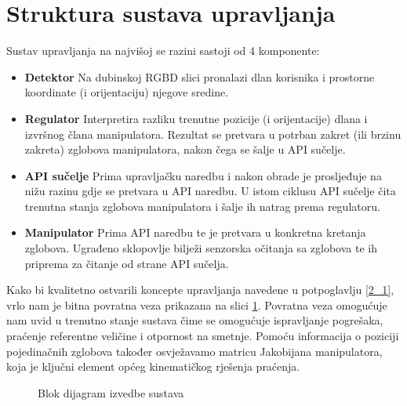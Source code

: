 \documentclass[times, utf8, diplomski, numeric]{fer}
\begin{document}
\section{Struktura sustava upravljanja}
Sustav upravljanja na najvišoj se razini sastoji od 4 komponente:
\begin{itemize}
  \item \textbf{Detektor} Na dubinskoj RGBD slici pronalazi dlan korisnika i prostorne koordinate (i orijentaciju) njegove sredine. 
  \item \textbf{Regulator} Interpretira razliku trenutne pozicije (i orijentacije) dlana i izvršnog člana manipulatora. 
  Rezultat se pretvara u potrban zakret (ili brzinu zakreta) zglobova manipulatora, nakon čega se šalje u API sučelje.
  \item  \textbf{API sučelje} Prima upravljačku naredbu i nakon obrade je prosljeđuje na nižu razinu gdje se pretvara u API naredbu.
  U istom ciklusu API sučelje čita trenutna stanja zglobova manipulatora i šalje ih natrag prema regulatoru.
  \item  \textbf{Manipulator} Prima API naredbu te je pretvara u konkretna kretanja zglobova. 
  Ugrađeno sklopovlje bilježi senzorska očitanja sa zglobova te ih priprema za čitanje od strane API sučelja.
\end{itemize}

Kako bi kvalitetno ostvarili koncepte upravljanja navedene u potpoglavlju \ref{2_1}, vrlo nam je bitna povratna veza prikazana na slici \ref{izvedba}.
Povratna veza omogućuje nam uvid u trenutno stanje sustava čime se omogućuje ispravljanje pogrešaka, praćenje referentne veličine i otpornost na smetnje.
Pomoću informacija o poziciji pojedinačnih zglobova također osvježavamo matricu Jakobijana manipulatora, koja je ključni element općeg kinematičkog rješenja praćenja.

\begin{figure}[!h]
\centering
{}
\caption{Blok dijagram izvedbe sustava}\label{izvedba}
\end{figure}
\end{document}
